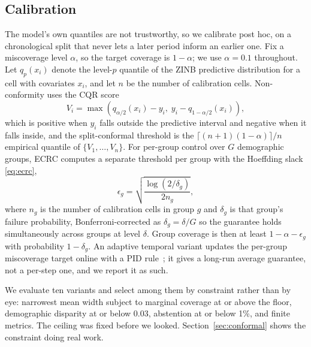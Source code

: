 \documentclass[journal,10pt,twocolumn]{IEEEtran}
\begin{document}
\subsection{Calibration}
\label{sec:calibration}
The model's own quantiles are not trustworthy, so we calibrate post hoc, on a
chronological split that never lets a later period inform an earlier one. Fix a
miscoverage level $\alpha$, so the target coverage is $1-\alpha$; we use
$\alpha = 0.1$ throughout. Let $q_p(x_i)$ denote the level-$p$ quantile of the
ZINB predictive distribution for a cell with covariates $x_i$, and let $n$ be the
number of calibration cells. Non-conformity uses the CQR score
\begin{equation}
\label{eq:cqr}
V_i = \max\!\left(q_{\alpha/2}(x_i) - y_i,\; y_i - q_{1-\alpha/2}(x_i)\right),
\end{equation}
which is positive when $y_i$ falls outside the predictive interval and negative
when it falls inside, and the split-conformal threshold is the
$\lceil (n+1)(1-\alpha) \rceil / n$ empirical quantile of
$\{V_1,\dots,V_n\}$. For per-group control over $G$ demographic groups, ECRC
computes a separate threshold per group with the Hoeffding slack
\eqref{eq:ecrc},
\begin{equation}
\label{eq:ecrc}
\epsilon_g = \sqrt{\frac{\log(2/\delta_g)}{2 n_g}},
\end{equation}
where $n_g$ is the number of calibration cells in group $g$ and $\delta_g$ is
that group's failure probability, Bonferroni-corrected as $\delta_g = \delta / G$
so the guarantee holds simultaneously across groups at level $\delta$. Group
coverage is then at least $1 - \alpha - \epsilon_g$ with probability
$1-\delta_g$. An adaptive temporal variant updates the per-group miscoverage
target online with a PID rule~\cite{angelopoulos2023conformal}; it gives a
long-run average guarantee, not a per-step one, and we report it as such.

We evaluate ten variants and select among them by constraint rather than by eye:
narrowest mean width subject to marginal coverage at or above the floor,
demographic disparity at or below 0.03, abstention at or below 1\%, and finite
metrics. The ceiling was fixed before we looked. Section~\ref{sec:conformal}
shows the constraint doing real work.
\end{document}
